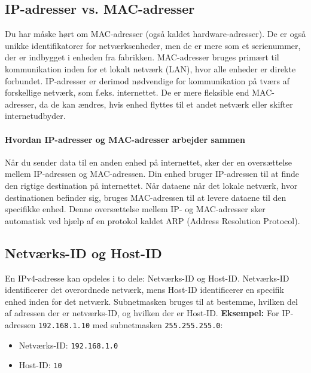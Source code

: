 \subsection{IP-adresser vs. MAC-adresser}
Du har måske hørt om MAC-adresser (også kaldet hardware-adresser). De er også unikke identifikatorer for netværksenheder, men de er mere som et serienummer, der er indbygget i enheden fra fabrikken. MAC-adresser bruges primært til kommunikation inden for et lokalt netværk (LAN), hvor alle enheder er direkte forbundet.
\newline
\newline
\noindent IP-adresser er derimod nødvendige for kommunikation på tværs af forskellige netværk, som f.eks. internettet. De er mere fleksible end MAC-adresser, da de kan ændres, hvis enhed flyttes til et andet netværk eller skifter internetudbyder.

\paragraph{Hvordan IP-adresser og MAC-adresser arbejder sammen}
Når du sender data til en anden enhed på internettet, sker der en oversættelse mellem IP-adressen og MAC-adressen. Din enhed bruger IP-adressen til at finde den rigtige destination på internettet. Når dataene når det lokale netværk, hvor destinationen befinder sig, bruges MAC-adressen til at levere dataene til den specifikke enhed.
\newline\newline\noindent 
Denne oversættelse mellem IP- og MAC-adresser sker automatisk ved hjælp af en protokol kaldet ARP (Address Resolution Protocol).

\subsection{Netværks-ID og Host-ID}
En IPv4-adresse kan opdeles i to dele: Netværks-ID og Host-ID. Netværks-ID identificerer det overordnede netværk, mens Host-ID identificerer en specifik enhed inden for det netværk. Subnetmasken bruges til at bestemme, hvilken del af adressen der er netværks-ID, og hvilken der er Host-ID.
\newline\newline\noindent 
\textbf{Eksempel:}
\newline\noindent For IP-adressen \texttt{192.168.1.10} med subnetmasken \texttt{255.255.255.0}:
\begin{itemize}
	\item Netværks-ID: \texttt{192.168.1.0}
	\item Host-ID: \texttt{10}
\end{itemize}

